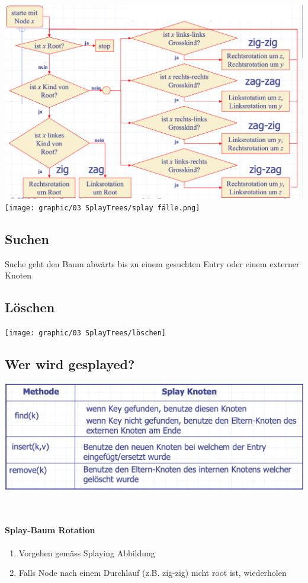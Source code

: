 \vspace{-8pt}
\begin{center}
    \includegraphics[scale=.2]{graphic/03 SplayTrees/splay.png}
    \texttt{[image: graphic/03 SplayTrees/splay fälle.png]}
\end{center}
\vspace{-8pt}

\subsection{Suchen}
Suche geht den Baum abwärts bis zu einem gesuchten Entry oder einem externer Knoten

\subsection{Löschen}
\begin{center}
    \texttt{[image: graphic/03 SplayTrees/löschen]}
\end{center}
\vspace{-8pt}

\subsection{Wer wird gesplayed?}
\begin{center}
    \includegraphics[scale=.25]{graphic/03 SplayTrees/who.png}
\end{center}

\vfill
$ $
\columnbreak
\paragraph{Splay-Baum Rotation}
\begin{enumerate}
    \item Vorgehen gemäss Splaying Abbildung
    \item Falls Node nach einem Durchlauf (z.B. zig-zig) nicht root ist, wiederholen
\end{enumerate}

\newpage
